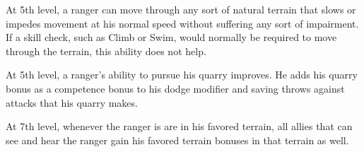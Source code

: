 \begin{comment}
\begin{dtable}
\lcaption{Ranger Spells Known}
\begin{tabularx}{\columnwidth}{X *{4}{>{\ccol}X}}
& \multicolumn{4}{c}{\thead{---{}---{}---{}---{}---Spells Known---{}---{}---{}---{}---}} \\
\thead{Level} & \thead{1st} & \thead{2nd} & \thead{3rd} & \thead{4th} \\
1st  & \x & \x & \x & \x \\
2nd  & \x & \x & \x & \x \\
3rd  & \x & \x & \x & \x \\
4th  & 1 & \x & \x & \x \\
5th  & 2 & \x & \x & \x \\
6th  & 2 & \x & \x & \x \\
7th  & 3 & \x & \x & \x \\
8th  & 3 & 1 & \x & \x \\
9th  & 3 & 2 & \x & \x \\
10th & 4 & 2 & \x & \x \\
11th & 4 & 2 & 1 & \x \\
12th & 4 & 3 & 2 & \x \\
13th & 4 & 3 & 2 & \x \\
14th & 4 & 3 & 2 & 1 \\
15th & 4 & 3 & 3 & 2 \\
16th & 4 & 3 & 3 & 2 \\
17th & 4 & 3 & 3 & 2 \\
18th & 4 & 3 & 3 & 3 \\
19th & 4 & 3 & 3 & 3 \\
20th & 4 & 3 & 3 & 3 \\
\end{tabularx}
\end{dtable}
\end{comment}

 At 5th level, a ranger can move through any sort of natural terrain that slows or impedes movement at his normal speed without suffering any sort of impairment. If a skill check, such as Climb or Swim, would normally be required to move through the terrain, this ability does not help.

 At 5th level, a ranger's ability to pursue his quarry improves. He adds his quarry bonus as a competence bonus to his dodge modifier and saving throws against attacks that his quarry makes.

 At 7th level, whenever the ranger is are in his favored terrain, all allies that can see and hear the ranger gain his favored terrain bonuses in that terrain as well.

